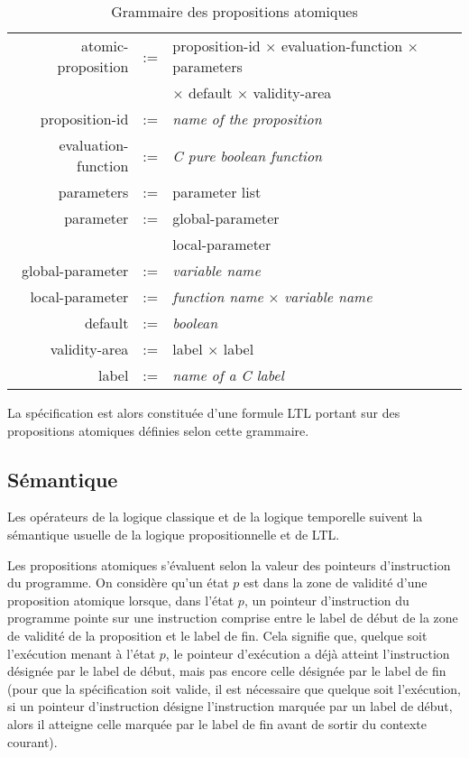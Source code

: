 \begin{table}[h]
\centering
\caption{Grammaire des propositions atomiques}
\label{tab:spe_gram}
\begin{tabular}[]{@{}rcl@{}}
\hline
atomic-proposition  & := & proposition-id \(\times\) evaluation-function \(\times\) parameters\\
                    &    & \(\times\) default \(\times\) validity-area\\
proposition-id      & := & \emph{name of the proposition}\\
evaluation-function & := & \emph{C pure boolean function}\\
parameters          & := & parameter list\\
parameter           & := & global-parameter\\
                    & \textbar{} & local-parameter\\
global-parameter    & := & \emph{variable name}\\
local-parameter     & := & \emph{function name} \(\times\) \emph{variable name}\\
default             & := & \emph{boolean}\\
validity-area       & := & label \(\times\) label\\
label               & := & \emph{name of a C label}\\
\hline
\end{tabular}
\end{table}

La spécification est alors constituée d'une formule LTL portant sur des
propositions atomiques définies selon cette grammaire.

\subsection{Sémantique}

Les opérateurs de la logique classique et de la logique temporelle
suivent la sémantique usuelle de la logique propositionnelle et de LTL.

Les propositions atomiques s'évaluent selon la valeur des pointeurs
d'instruction du programme. On considère qu'un état \(p\) est dans la zone de
validité d'une proposition atomique lorsque, dans l'état \(p\), un pointeur
d'instruction du programme pointe sur une instruction comprise entre le label de
début de la zone de validité de la proposition et le label de fin. Cela signifie
que, quelque soit l'exécution menant à l'état \(p\), le pointeur d'exécution a
déjà atteint l'instruction désignée par le label de début, mais pas encore celle
désignée par le label de fin (pour que la spécification soit valide, il est
nécessaire que quelque soit l'exécution, si un pointeur d'instruction désigne
l'instruction marquée par un label de début, alors il atteigne celle marquée par
le label de fin avant de sortir du contexte courant).

